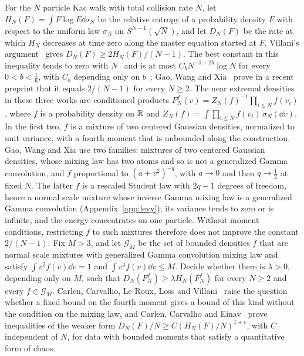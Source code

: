\begin{problem}[Kinetic]
\label{prob:kinetic}
For the $N$ particle Kac walk with total collision rate $N$, let $H_N(F) = \int F\log F\dd\sigma_N$ be the relative entropy of a probability density $F$ with respect to the uniform law $\sigma_N$ on $S^{N-1}(\sqrt N)$, and let $D_N(F)$ be the rate at which $H_N$ decreases at time zero along the master equation started at $F$. Villani's argument~\cite{villani2003cercignani} gives $D_N(F)\geq2H_N(F)/(N-1)$. The best constant in this inequality tends to zero with $N$~\cite{cclv2010} and is at most $C_bN^{-1+2b}\log N$ for every $0<b<\frac16$, with $C_b$ depending only on $b$~\cite{einav2011}; Gao, Wang and Xia~\cite{gaowangxia2026} prove in a recent preprint that it equals $2/(N-1)$ for every $N\geq2$. The near extremal densities in these three works are conditioned products $F^f_N(v) = Z_N(f)^{-1}\prod_{i\leq N}f(v_i)$, where $f$ is a probability density on $\mathbb{R}$ and $Z_N(f) = \int\prod_{i\leq N}f(v_i)\,\sigma_N(\dd v)$. In the first two, $f$ is a mixture of two centered Gaussian densities, normalized to unit variance, with a fourth moment that is unbounded along the construction. Gao, Wang and Xia use two families: mixtures of two centered Gaussian densities, whose mixing law has two atoms and so is not a generalized Gamma convolution, and $f$ proportional to $(a+v^2)^{-q}$, with $a\to0$ and then $q\to\frac12$ at fixed $N$. The latter $f$ is a rescaled Student law with $2q-1$ degrees of freedom, hence a normal scale mixture whose inverse Gamma mixing law is a generalized Gamma convolution (Appendix~\ref{app:levy}); its variance tends to zero or is infinite, and the energy concentrates on one particle. Without moment conditions, restricting $f$ to such mixtures therefore does not improve the constant $2/(N-1)$. Fix $M>3$, and let $\mathcal G_M$ be the set of bounded densities $f$ that are normal scale mixtures with generalized Gamma convolution mixing law and satisfy $\int v^2f(v)\dd v = 1$ and $\int v^4f(v)\dd v\leq M$. Decide whether there is $\lambda>0$, depending only on $M$, such that $D_N(F^f_N)\geq\lambda H_N(F^f_N)$ for every $N\geq2$ and every $f\in\mathcal G_M$. Carlen, Carvalho, Le Roux, Loss and Villani~\cite{cclv2010} raise the question whether a fixed bound on the fourth moment gives a bound of this kind without the condition on the mixing law, and Carlen, Carvalho and Einav~\cite{carlencarvalhoeinav2018} prove inequalities of the weaker form $D_N(F)/N\geq C(H_N(F)/N)^{1+\varepsilon}$, with $C$ independent of $N$, for data with bounded moments that satisfy a quantitative form of chaos.
\end{problem}

